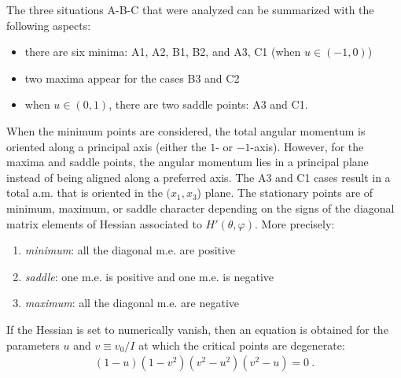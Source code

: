 The three situations A-B-C that were analyzed can be summarized with the following aspects:
\begin{itemize}
    \item there are six minima: A1, A2, B1, B2, and A3, C1 (when $u\in(-1,0)$)
    \item two maxima appear for the cases B3 and C2
    \item when $u\in(0,1)$, there are two saddle points: A3 and C1.
\end{itemize}

When the minimum points are considered, the total angular momentum is oriented along a principal axis (either the $1$- or $-1$-axis). However, for the maxima and saddle points, the angular momentum lies in a principal plane instead of being aligned along a preferred axis. The A3 and C1 cases result in a total a.m. that is oriented in the $(x_1,x_3$) plane. The stationary points are of minimum, maximum, or saddle character depending on the signs of the diagonal matrix elements of Hessian associated to $H'(\theta,\varphi)$. More precisely:
\begin{enumerate}
    \item \emph{minimum}: all the diagonal m.e. are positive
    \item \emph{saddle}: one m.e. is positive and one m.e. is negative
    \item \emph{maximum}: all the diagonal m.e. are negative
\end{enumerate}

If the Hessian is set to numerically vanish, then an equation is obtained for the parameters $u$ and $v\equiv v_0/I$ at which the critical points are degenerate:
\begin{align}
    (1-u)(1-v^2)(v^2-u^2)(v^2-u)=0\ .
    \label{new-boson-phase-diagram-parameter-equation}
\end{align}

